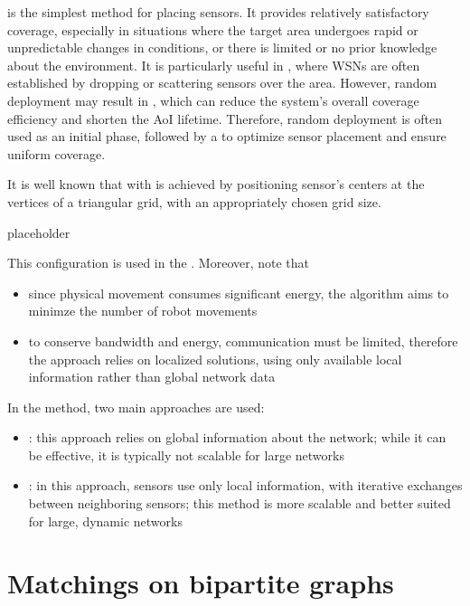 \documentclass[a4paper, 12pt]{report}
\begin{document}
     is the simplest method for placing sensors. It provides relatively satisfactory coverage, especially in situations where the target area undergoes rapid or unpredictable changes in conditions, or there is limited or no prior knowledge about the environment. It is particularly useful in , where WSNs are often established by dropping or scattering sensors over the area. However, random deployment may result in , which can reduce the system's overall coverage efficiency and shorten the AoI lifetime. Therefore, random deployment is often used as an initial phase, followed by a  to optimize sensor placement and ensure uniform coverage.

    It is well known that  with  is achieved by positioning sensor's centers at the vertices of a triangular grid, with an appropriately chosen grid size.

    placeholder 

    This configuration is used in the . Moreover, note that

    \begin{itemize}
        \item since physical movement consumes significant energy, the algorithm aims to minimze the number of robot movements
        \item to conserve bandwidth and energy, communication must be limited, therefore the approach relies on localized solutions, using only available local information rather than global network data
    \end{itemize}

    In the  method, two main approaches are used:

    \begin{itemize}
        \item {}: this approach relies on global information about the network; while it can be effective, it is typically not scalable for large networks
        \item {}: in this approach, sensors use only local information, with iterative exchanges between neighboring sensors; this method is more scalable and better suited for large, dynamic networks
    \end{itemize}

    \section{Matchings on bipartite graphs}
\end{document}
